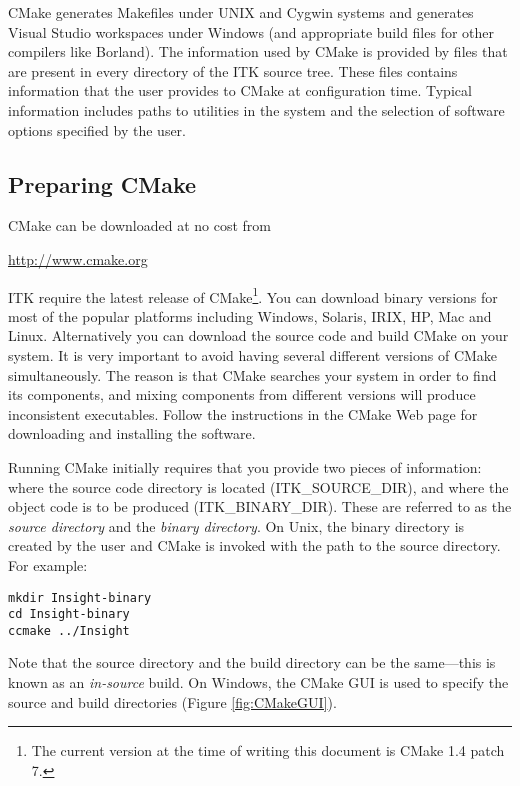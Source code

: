 CMake generates Makefiles under UNIX and Cygwin systems and generates Visual
Studio workspaces under Windows (and appropriate build files for other
compilers like Borland). The information used by CMake is provided by
 files that are present in every directory of the ITK
source tree. These files contains information that the user
provides to CMake at configuration time. Typical information includes paths
to utilities in the system and the selection of software options specified by
the user.

\subsection{Preparing CMake}
\label{sec:CMakeforITK}
 

CMake can be downloaded at no cost from 
\begin{center} 
  \url{http://www.cmake.org}
\end{center}

ITK require the latest release of CMake\footnote{The current version at the
time of writing this document is CMake 1.4 patch 7.}. You can download binary
versions for most of the popular platforms including Windows, Solaris, IRIX,
HP, Mac and Linux. Alternatively you can download the source code and build
CMake on your system. It is very important to avoid having several different
versions of CMake simultaneously. The reason is that CMake searches your
system in order to find its components, and mixing components from different
versions will produce inconsistent executables. Follow the instructions in the
CMake Web page for downloading and installing the software.

Running CMake initially requires that you provide two pieces of information:
where the source code directory is located (ITK\_SOURCE\_DIR), and where the
object code is to be produced (ITK\_BINARY\_DIR). These are referred to as the
\emph{source directory} and the \emph{binary directory}. On Unix, the binary
directory is created by the user and CMake is invoked with the path to the
source directory. For example:

\begin{verbatim}
mkdir Insight-binary
cd Insight-binary
ccmake ../Insight
\end{verbatim}

Note that the source directory and the build directory can be the
same---this is known as an \emph{in-source} build. On Windows, the CMake 
GUI is used to specify the source and build directories (Figure
\ref{fig:CMakeGUI}).

